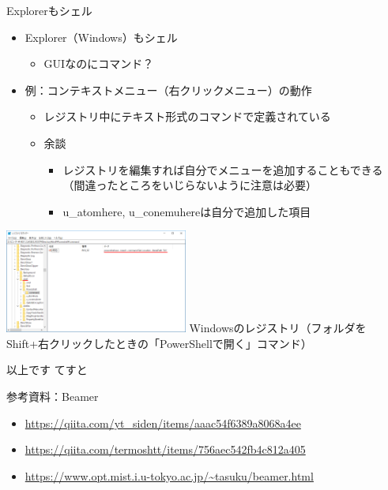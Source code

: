 \documentclass[12pt,aspectratio=169]{beamer}
\begin{document}
\begin{frame}{Explorerもシェル}

  \begin{minipage}{0.45\textwidth}
    \begin{itemize}
      \item Explorer（Windows）もシェル
        \begin{itemize}
          \item GUIなのにコマンド？
        \end{itemize}
      \item 例：コンテキストメニュー（右クリックメニュー）の動作
        \begin{itemize}
          \item レジストリ中にテキスト形式のコマンドで定義されている
          \item { \tiny 余談 }
            \begin{itemize}
              \item { \tiny レジストリを編集すれば自分でメニューを追加することもできる（間違ったところをいじらないように注意は必要） }
              \item { \tiny u\_atomhere, u\_conemuhereは自分で追加した項目 }
            \end{itemize}
        \end{itemize}
    \end{itemize}

  \end{minipage}
  \hfill
  \begin{minipage}{0.45\textwidth}
    \includegraphics[width=6cm,bb=0 0 659 481]{./images/regedit.png}
    { \tiny Windowsのレジストリ（フォルダをShift+右クリックしたときの「PowerShellで開く」コマンド） }
  \end{minipage}

\end{frame}


\begin{frame}{以上です}
てすと

\end{frame}


\begin{frame}{参考資料：Beamer}
  \begin{itemize}
    \item \url { https://qiita.com/yt_siden/items/aaac54f6389a8068a4ee }
    \item \url { https://qiita.com/termoshtt/items/756aec542fb4c812a405 }
    \item \url { https://www.opt.mist.i.u-tokyo.ac.jp/~tasuku/beamer.html }
  \end{itemize}

\end{frame}
\end{document}
